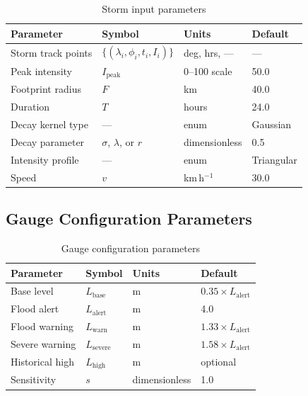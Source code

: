 \documentclass[11pt,a4paper]{article}
\begin{document}
\begin{table}[H]
    \centering
    \caption{Storm input parameters}
    \label{tab:storm_params}
    \begin{tabular}{llll}
        \toprule
        \textbf{Parameter} & \textbf{Symbol} & \textbf{Units} & \textbf{Default} \\
        \midrule
        Storm track points & $\{(\lambda_i, \phi_i, t_i, I_i)\}$ & deg, hrs, --- & --- \\
        Peak intensity & $I_{\text{peak}}$ & 0--100 scale & 50.0 \\
        Footprint radius & $F$ & km & 40.0 \\
        Duration & $T$ & hours & 24.0 \\
        Decay kernel type & --- & enum & Gaussian \\
        Decay parameter & $\sigma$, $\lambda$, or $r$ & dimensionless & 0.5 \\
        Intensity profile & --- & enum & Triangular \\
        Speed & $v$ & km\,h$^{-1}$ & 30.0 \\
        \bottomrule
    \end{tabular}
\end{table}

\subsection{Gauge Configuration Parameters}

\begin{table}[H]
    \centering
    \caption{Gauge configuration parameters}
    \label{tab:gauge_params}
    \begin{tabular}{llll}
        \toprule
        \textbf{Parameter} & \textbf{Symbol} & \textbf{Units} & \textbf{Default} \\
        \midrule
        Base level & $L_{\text{base}}$ & m & $0.35 \times L_{\text{alert}}$ \\
        Flood alert & $L_{\text{alert}}$ & m & 4.0 \\
        Flood warning & $L_{\text{warn}}$ & m & $1.33 \times L_{\text{alert}}$ \\
        Severe warning & $L_{\text{severe}}$ & m & $1.58 \times L_{\text{alert}}$ \\
        Historical high & $L_{\text{high}}$ & m & optional \\
        Sensitivity & $s$ & dimensionless & 1.0 \\
        \bottomrule
    \end{tabular}
\end{table}
\end{document}
